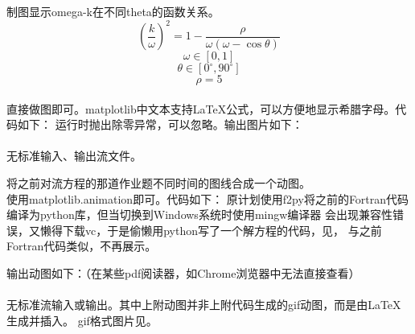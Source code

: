 \documentclass{ctexart}
\begin{document}
\maketitle

\begin{answer}
    制图显示omega-k在不同theta的函数关系。
    \[\left(\frac{k}{\omega}\right)^2=1-\frac{\rho}{\omega(\omega-\cos\theta)}\]
    \[\omega\in[0, 1]\]
    \[\theta\in[0^{\circ}, 90^{\circ}]\]
    \[\rho=5\]\\

    直接做图即可。matplotlib中文本支持\LaTeX 公式，可以方便地显示希腊字母。代码如下：
    运行时抛出除零异常，可以忽略。输出图片如下：\\
    \\
    无标准输入、输出流文件。

    将之前对流方程的那道作业题不同时间的图线合成一个动图。\\

    使用matplotlib.animation即可。代码如下：
    原计划使用f2py将之前的Fortran代码编译为python库，但当切换到Windows系统时使用mingw编译器
    会出现兼容性错误，又懒得下载vc，于是偷懒用python写了一个解方程的代码，见，
    与之前Fortran代码类似，不再展示。

    输出动图如下：（在某些pdf阅读器，如Chrome浏览器中无法直接查看）\\
    \\
    无标准流输入或输出。其中上附动图并非上附代码生成的gif动图，而是由\LaTeX 生成并插入。
    gif格式图片见。

\end{answer}
\end{document}

